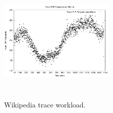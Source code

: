 


\begin{figure}
\begin{center}
\includegraphics[width=0.49\textwidth, height=6cm]{./images/traceWorkload}
\end{center}
\vspace{-5mm}
\caption{Wikipedia trace workload.}
\label{workload}
\end{figure}





